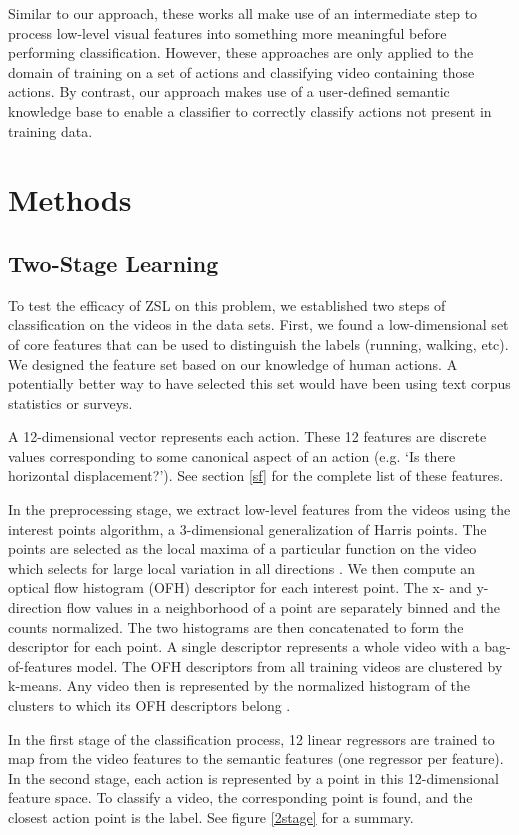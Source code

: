\documentclass{article}
\begin{document}
Similar to our approach, these works all make use of an intermediate step to process low-level visual features into something more meaningful before performing classification. However, these approaches are only applied to the domain of training on a set of actions and classifying video containing those actions. By contrast, our approach makes use of a user-defined semantic knowledge base to enable a classifier to correctly classify actions not present in training data.

\section{Methods}

\subsection{Two-Stage Learning}
To test the efficacy of ZSL on this problem, we established two steps of classification on the videos in the data sets. First, we found a low-dimensional set of core features that can be used to distinguish the labels (running, walking, etc).  We designed the feature set based on our knowledge of human actions. A potentially better way to have selected this set would have been using text corpus statistics or surveys.

A 12-dimensional vector represents each action. These 12 features are discrete values corresponding to some canonical aspect of an action (e.g. `Is there horizontal displacement?'). See section \ref{sf} for the complete list of these features.

In the preprocessing stage, we extract low-level features from the videos using the interest points algorithm, a 3-dimensional generalization of Harris points. The points are selected as the local maxima of a particular function on the video which selects for large local variation in all directions \cite{Laptev05}. We then compute an optical flow histogram (OFH) descriptor for each interest point. The x- and y-direction flow values in a neighborhood of a point are separately binned and the counts normalized. The two histograms are then concatenated to form the descriptor for each point. A single descriptor represents a whole video with a bag-of-features model. The OFH descriptors from all training videos are clustered by k-means. Any video then is represented by the normalized histogram of the clusters to which its OFH descriptors belong \cite{Laptev04}.

In the first stage of the classification process, 12 linear regressors are trained to map from the video features to the semantic features (one regressor per feature).  In the second stage, each action is represented by a point in this 12-dimensional feature space. To classify a video, the corresponding point is found, and the closest action point is the label. See figure \ref{2stage} for a summary.
\end{document}
